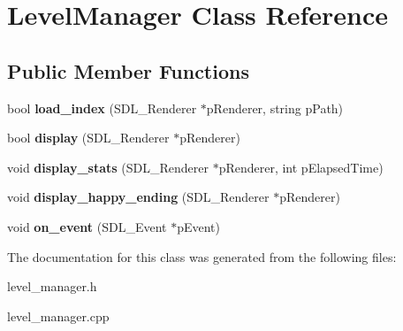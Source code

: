 \hypertarget{classLevelManager}{}\section{Level\+Manager Class Reference}
\label{classLevelManager}
\subsection*{Public Member Functions}
\begin{DoxyCompactItemize}
\item 
\mbox{\label{classLevelManager_aa27f07e6f36a10dadf3f45e7aa6853e2}} 
bool {\bfseries load\+\_\+index} (S\+D\+L\+\_\+\+Renderer $\ast$p\+Renderer, string p\+Path)
\item 
\mbox{\label{classLevelManager_a65dd83ec67373bc5383c3c3b3dcef6df}} 
bool {\bfseries display} (S\+D\+L\+\_\+\+Renderer $\ast$p\+Renderer)
\item 
\mbox{\label{classLevelManager_a63aee40ecd78d22f8877651725596bbe}} 
void {\bfseries display\+\_\+stats} (S\+D\+L\+\_\+\+Renderer $\ast$p\+Renderer, int p\+Elapsed\+Time)
\item 
\mbox{\label{classLevelManager_a39d87b9b977849fe4bb353d745c827d5}} 
void {\bfseries display\+\_\+happy\+\_\+ending} (S\+D\+L\+\_\+\+Renderer $\ast$p\+Renderer)
\item 
\mbox{\label{classLevelManager_a11811df8e9fa6e33cc2a8f7e924f2873}} 
void {\bfseries on\+\_\+event} (S\+D\+L\+\_\+\+Event $\ast$p\+Event)
\end{DoxyCompactItemize}


The documentation for this class was generated from the following files\+:\begin{DoxyCompactItemize}
\item 
level\+\_\+manager.\+h\item 
level\+\_\+manager.\+cpp\end{DoxyCompactItemize}
